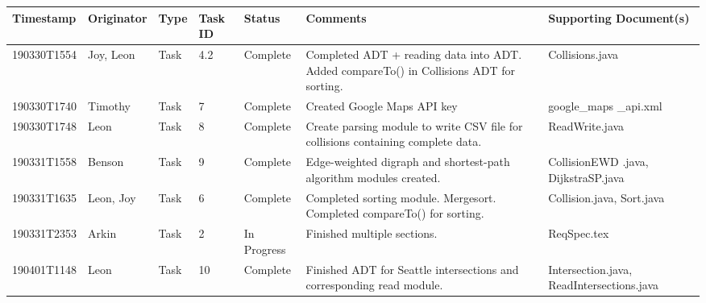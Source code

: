 \documentclass[12pt]{article}
\begin{document}
\begin{center}
    \begin{tabular}{| P{2.5cm} | P{2.2cm} | P{1.4cm} | P{0.9cm} | P{1.9cm} | P{2.8cm} | P{3cm} |}
        \hline
        \textbf{Timestamp} & \textbf{Originator} & \textbf{Type} 
        & \textbf{Task ID} & \textbf{Status} & \textbf{Comments} 
        & \textbf{Supporting Document(s)}\\
        \hline
        190330T1554 & Joy, Leon & Task & 4.2 & Complete & Completed ADT + reading data into ADT. Added compareTo() in Collisions ADT for sorting. & Collisions.java \\
        \hline
        190330T1740 & Timothy & Task & 7 & Complete & Created Google Maps API key & google\_maps \_api.xml\\
        \hline
        190330T1748 & Leon & Task & 8 & Complete & Create parsing module to write CSV file for collisions containing complete data. & ReadWrite.java\\
        \hline
        190331T1558 & Benson & Task & 9 & Complete & Edge-weighted digraph and shortest-path algorithm modules created. & CollisionEWD
        .java, DijkstraSP.java\\
        \hline
        190331T1635 & Leon, Joy & Task & 6 & Complete & Completed sorting module. Mergesort. Completed compareTo() for sorting. & Collision.java, 
        Sort.java\\
        \hline
        190331T2353 & Arkin & Task & 2 & In Progress & Finished multiple sections. & ReqSpec.tex\\
        \hline
        190401T1148 & Leon & Task & 10 & Complete & Finished ADT for Seattle intersections and corresponding read module. & Intersection.java, ReadIntersections.java\\
        \hline
    \end{tabular}
    

\end{center}
\end{document}

